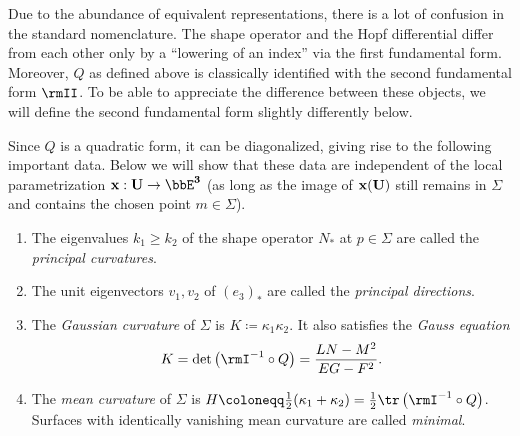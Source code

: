 \begin{rem}
    Due to the abundance of equivalent representations, there is a lot of confusion in the standard nomenclature. The shape operator and the Hopf differential differ from each other only by a ``lowering of an index'' via the first fundamental form. Moreover, $Q$ as defined above is classically identified with the second fundamental form $\rmII$. To be able to appreciate the difference between these objects, we will define the second fundamental form slightly differently below.
\end{rem}

Since $Q$ is a quadratic form, it can be diagonalized, giving rise to the following important data. Below we will show that these data are independent of the local parametrization $\bf{x}:U\to \bbE^3$ (as long as the image of $\bf{x}(U)$ still remains in $\Sigma$ and contains the chosen point $m\in\Sigma$).

\begin{defn}
    \begin{enumerate}
        \item The eigenvalues $k_1\geq k_2$ of the shape operator $N_\ast$ at $p\in \Sigma$ are called the \emph{principal curvatures}.
        \item The unit eigenvectors $v_1,v_2$ of $(e_3)_\ast$ are called the \emph{principal directions}.
        \item The \emph{Gaussian curvature} of $\Sigma$ is $K\coloneqq \kappa_1\kappa_2$. It also satisfies the \emph{Gauss equation}
        \[K=\det\left(\rmI^{-1}\circ Q\right)=\frac{LN-M^2}{EG-F^2}.\]
        \item The \emph{mean curvature} of $\Sigma$ is $H\coloneqq \frac12(\kappa_1+\kappa_2)=\frac12\tr\left(\rmI^{-1}\circ Q\right)$. Surfaces with identically vanishing mean curvature are called \emph{minimal}.
    \end{enumerate}
\end{defn}

